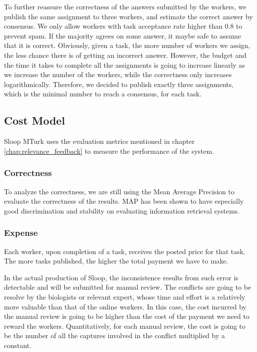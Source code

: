 To further reassure the correctness of the answers submitted by the workers, we
publish the same assignment to three workers, and estimate the correct answer
by consensus. We only allow workers with task acceptance rate higher than 0.8
to prevent spam. If the majority agrees on some answer, it maybe safe to assume
that it is correct. Obviously, given a task, the more number of workers we
assign, the less chance there is of getting an incorrect answer. However, the
budget and the time it takes to complete all the assignments is going to
increase linearly as we increase the number of the workers, while the
correctness only increases logarithmically. Therefore, we decided to publish
exactly three assignments, which is the minimal number to reach a consensus,
for each task.

\subsection{Cost Model}

Sloop MTurk uses the evaluation metrics mentioned in chapter
\ref{chap:relevance_feedback} to measure the performance of the system.

\subsubsection{Correctness}

To analyze the correctness, we are still using the Mean Average Precision to
evaluate the correctness of the results. MAP has been shown to have especially
good discrimination and stability on evaluating information retrieval
systems\cite{manning2008introduction}.

\subsubsection{Expense}

Each worker, upon completion of a task, receives the posted price for that
task. The more tasks published, the higher the total payment we have to make.

In the actual production of Sloop, the inconsistence results from such error is
detectable and will be submitted for manual review. The conflicts are going to
be resolve by the biologists or relevant expert, whose time and effort is a
relatively more valuable than that of the online workers. In this case, the
cost incurred by the manual review is going to be higher than the cost of the
payment we need to reward the workers. Quantitatively, for each manual review,
the cost is going to be the number of all the captures involved in the conflict
multiplied by a constant.
